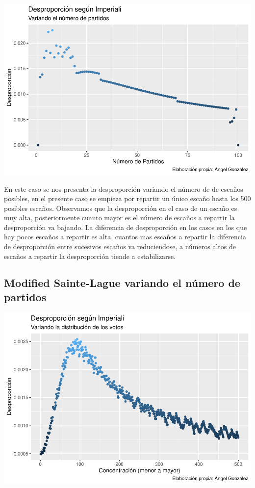 \documentclass[12pt,a4paper,]{book}
\numberwithin{dummy}{section}
\theoremstyle{ocrenumbox}
\theoremstyle{blacknumex}
\theoremstyle{blacknumbox}
\theoremstyle{ocrenum}
\theoremstyle{ocrenum}
\begin{document}
\begin{center}\includegraphics[width=0.95\linewidth]{figurasR/unnamed-chunk-22-1} \end{center}

En este caso se nos presenta la desproporción variando el número de de
escaños posibles, en el presente caso se empieza por repartir un único
escaño hasta los 500 posibles escaños. Observamos que la desproporción
en el caso de un escaño es muy alta, posteriormente cuanto mayor es el
número de escaños a repartir la desproporción va bajando. La diferencia
de desproporción en los casos en los que hay pocos escaños a repartir es
alta, cuantos mas escaños a repartir la diferencia de desproporción
entre sucesivos escaños va reduciendose, a números altos de escaños a
repartir la desproporción tiende a estabilizarse.

\hypertarget{modified-sainte-lague-variando-el-nuxfamero-de-partidos}{%
\subsection{Modified Sainte-Lague variando el número de
partidos}\label{modified-sainte-lague-variando-el-nuxfamero-de-partidos}}

\begin{center}\includegraphics[width=0.95\linewidth]{figurasR/unnamed-chunk-23-1} \end{center}
\end{document}
